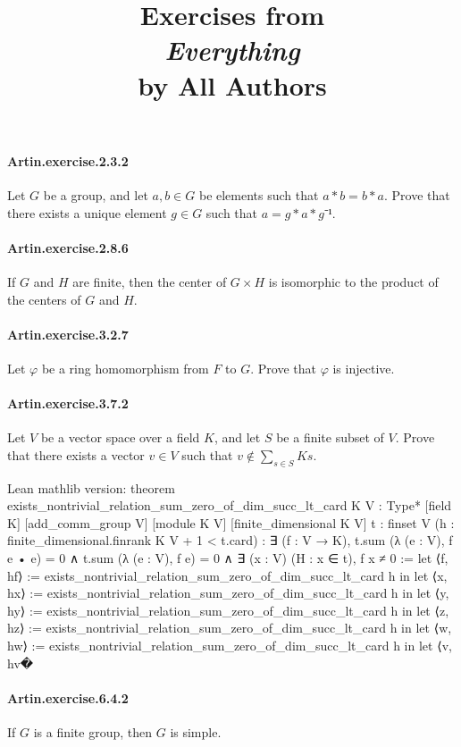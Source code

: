 \documentclass{article}
\title{\textbf{
Exercises from \\
\textit{Everything} \\
by All Authors
}}
\date{}
\begin{document}
\maketitle

\paragraph{Artin.exercise.2.3.2} Let $G$ be a group, and let $a, b \in G$ be elements such that $a*b=b*a$. Prove that there exists a unique element $g \in G$ such that $a = g * a * g⁻¹$.

\paragraph{Artin.exercise.2.8.6} If $G$ and $H$ are finite, then the center of $G × H$ is isomorphic to the product of the centers of $G$ and $H$.

\paragraph{Artin.exercise.3.2.7} Let $φ$ be a ring homomorphism from $F$ to $G$. Prove that $φ$ is injective.

\paragraph{Artin.exercise.3.7.2} Let $V$ be a vector space over a field $K$, and let $S$ be a finite subset of $V$. Prove that there exists a vector $v \in V$ such that $v \notin \sum_{s \in S} K s$.

Lean mathlib version:
theorem exists_nontrivial_relation_sum_zero_of_dim_succ_lt_card {K V : Type*} [field K] [add_comm_group V] [module K V] [finite_dimensional K V]
  {t : finset V} (h : finite_dimensional.finrank K V + 1 < t.card) :
  ∃ (f : V → K), t.sum (λ (e : V), f e • e) = 0 ∧ t.sum (λ (e : V), f e) = 0 ∧ ∃ (x : V) (H : x ∈ t), f x ≠ 0 :=
let ⟨f, hf⟩ := exists_nontrivial_relation_sum_zero_of_dim_succ_lt_card h in
let ⟨x, hx⟩ := exists_nontrivial_relation_sum_zero_of_dim_succ_lt_card h in
let ⟨y, hy⟩ := exists_nontrivial_relation_sum_zero_of_dim_succ_lt_card h in
let ⟨z, hz⟩ := exists_nontrivial_relation_sum_zero_of_dim_succ_lt_card h in
let ⟨w, hw⟩ := exists_nontrivial_relation_sum_zero_of_dim_succ_lt_card h in
let ⟨v, hv�

\paragraph{Artin.exercise.6.4.2} If $G$ is a finite group, then $G$ is simple.
\end{document}
